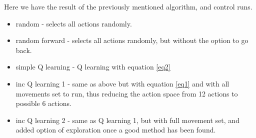 \documentclass[a4paper,11pt]{article}
\begin{document}
Here we have the result of the previously mentioned algorithm, and control runs.

\begin{itemize}
    \item random - selects all actions randomly.
    \item random forward - selects all actions randomly, but without the option to go back.
    \item simple Q learning - Q learning with equation \ref{eq2}
    \item inc Q learning 1 - same as above but with equation \ref{eq1} and with all movements set to run, thus reducing the action space from 12 actions to possible 6 actions.
    \item inc Q learning 2 - same as Q learning 1, but with full movement set, and added option of exploration once a good method has been found.
\end{itemize}
\end{document}
